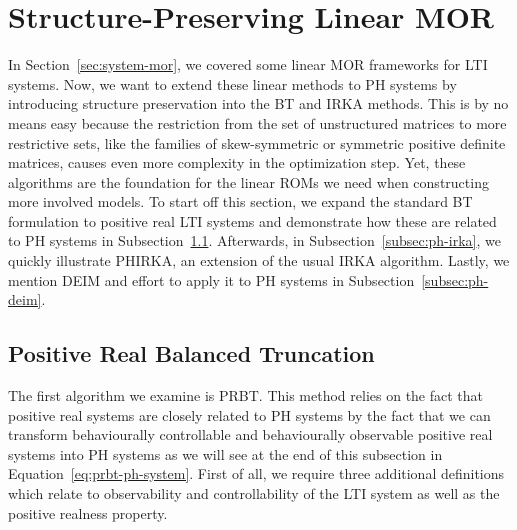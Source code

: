 \section{Structure-Preserving Linear MOR}\label{sec:structure-preserving-mor}

In Section~\ref{sec:system-mor}, we covered some linear \ac{MOR} frameworks for \ac{LTI} systems.
Now, we want to extend these linear methods to \ac{PH} systems by introducing structure preservation into the \ac{BT} and \ac{IRKA} methods.
This is by no means easy because the restriction from the set of unstructured matrices to more restrictive sets, like the families of skew-symmetric or symmetric positive definite matrices, causes even more complexity in the optimization step.
Yet, these algorithms are the foundation for the linear \acp{ROM} we need when constructing more involved models.
To start off this section, we expand the standard \ac{BT} formulation to positive real \ac{LTI} systems and demonstrate how these are related to \ac{PH} systems in Subsection~\ref{subsec:prbt}.
Afterwards, in Subsection~\ref{subsec:ph-irka}, we quickly illustrate \ac{PHIRKA}, an extension of the usual \ac{IRKA} algorithm.
Lastly, we mention \ac{DEIM} and effort to apply it to \ac{PH} systems in Subsection~\ref{subsec:ph-deim}.

\subsection{Positive Real Balanced Truncation}\label{subsec:prbt}

The first algorithm we examine is \acf{PRBT}.
This method relies on the fact that positive real systems are closely related to \ac{PH} systems by the fact that we can transform behaviourally controllable and behaviourally observable positive real systems into \ac{PH} systems as we will see at the end of this subsection in Equation~\eqref{eq:prbt-ph-system}.
First of all, we require three additional definitions which relate to observability and controllability of the \ac{LTI} system as well as the positive realness property.

